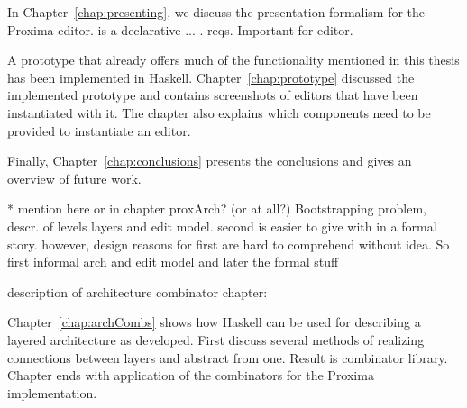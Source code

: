 In Chapter~\ref{chap:presenting}, we discuss the {\Xprez} presentation formalism for the Proxima editor. {\Xprez} is a declarative ... . reqs. Important for editor.
\fromHere

A prototype that already offers much of the functionality mentioned in this thesis has been implemented in Haskell. Chapter~\ref{chap:prototype} discussed the implemented prototype and contains screenshots of editors that have been instantiated with it. The chapter also explains which components need to be provided to instantiate an editor.

Finally, Chapter~\ref{chap:conclusions} presents the conclusions and gives an overview of future work.  


\bc
* mention here or in chapter proxArch? (or at all?)
Bootstrapping problem, descr. of levels layers and edit model. second is easier to give with in a formal story. however, design reasons for first are hard to comprehend without idea. So first informal arch and edit model and later the formal stuff


description of architecture combinator chapter:

Chapter~\ref{chap:archCombs} shows how Haskell can be used for describing a layered architecture as developed.
First discuss several methods of realizing connections between layers and abstract from one. Result is combinator library. Chapter ends with application of the combinators for the Proxima implementation.

\ec
